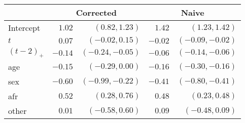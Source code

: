 \documentclass[12pt]{article}
\begin{document}
\begin{table}[h]
\centering
\begin{tabular}{| l |  r r |  r r  |} \hline
& \multicolumn{2}{c|}{Corrected}   & \multicolumn{2}{|c|}{Naive}  \\ \hline
Intercept & $  1.02 $ & $(  0.82  ,  1.23  )$ & $  1.42 $ &  $(  1.23    ,  1.42  )$ \\
$t$       & $  0.07 $ & $( -0.02  ,  0.15  )$ & $ -0.02 $ &  $( -0.09    , -0.02  )$ \\
$(t-2)_+$ & $ -0.14 $ & $( -0.24  , -0.05  )$ & $ -0.06 $ &  $( -0.14    , -0.06  )$ \\
age       & $ -0.15 $ & $( -0.29  ,  0.00  )$ & $ -0.16 $ &  $( -0.30    , -0.16  )$ \\
sex       & $ -0.60 $ & $( -0.99  , -0.22  )$ & $ -0.41 $ &  $( -0.80    , -0.41  )$ \\
afr       & $  0.52 $ & $(  0.28  ,  0.76  )$ & $  0.48 $ &  $(  0.23    ,  0.48  )$ \\
other     & $  0.01 $ & $( -0.58  ,  0.60  )$ & $  0.09 $ &  $( -0.48    ,  0.09  )$  \\ \hline
\end{tabular} 
\end{table}
\end{document}
